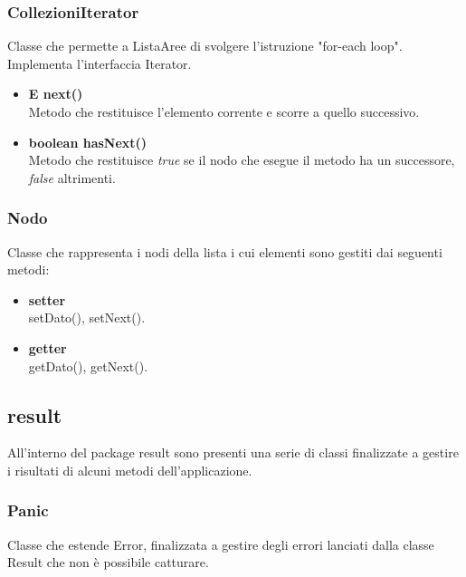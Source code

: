\documentclass[a4paper, 12pt]{scrreprt}
\begin{document}
				\subsubsection{CollezioniIterator}
				Classe che permette a ListaAree di svolgere l'istruzione "for-each loop". Implementa l'interfaccia Iterator.
				\begin{itemize}
					\item\textbf{E next()}
					\\Metodo che restituisce l'elemento corrente e scorre a quello successivo.
					\item\textbf{boolean hasNext()}
					\\Metodo che restituisce \textit{true} se il nodo che esegue il metodo ha un successore, \textit{false} altrimenti.
				\end{itemize}

				\subsubsection{Nodo}
				Classe che rappresenta i nodi della lista i cui elementi sono gestiti dai seguenti metodi:\\
				\begin{itemize}
					\item\textbf{setter}
					\\setDato(), setNext().
					\item\textbf{getter}
					\\getDato(), getNext().
				\end{itemize}

			\subsection{result}
				All'interno del package result sono presenti una serie di classi finalizzate a gestire i risultati di alcuni metodi dell'applicazione.
				
				\subsubsection{Panic}
				Classe che estende Error, finalizzata a gestire degli errori lanciati dalla classe Result che non \`e possibile catturare.
\end{document}
